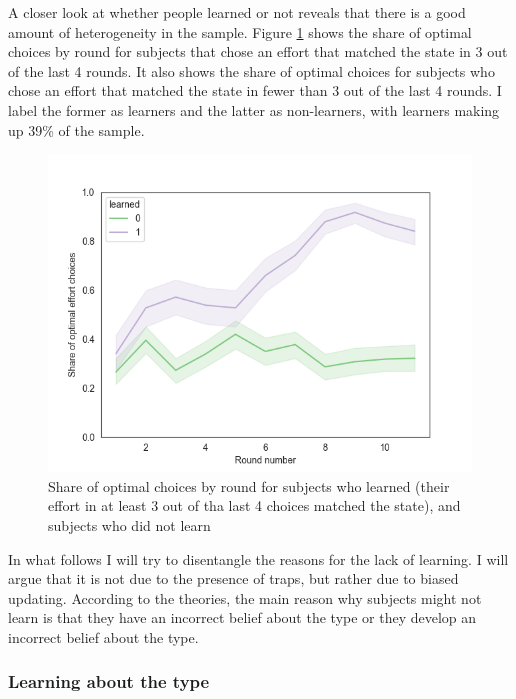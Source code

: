 \documentclass[
  12pt,
]{article}
\begin{document}
A closer look at whether people learned or not reveals that there is a
good amount of heterogeneity in the sample. Figure
\ref{fig:learning-by-groups} shows the share of optimal choices by round
for subjects that chose an effort that matched the state in 3 out of the
last 4 rounds. It also shows the share of optimal choices for subjects
who chose an effort that matched the state in fewer than 3 out of the
last 4 rounds. I label the former as learners and the latter as
non-learners, with learners making up 39\% of the sample.

\begin{figure}
\hypertarget{fig:learning-by-groups}{%
\centering
\includegraphics{../figures/learning_groups.png}
\caption{Share of optimal choices by round for subjects who learned
(their effort in at least 3 out of tha last 4 choices matched the
state), and subjects who did not learn}\label{fig:learning-by-groups}
}
\end{figure}

In what follows I will try to disentangle the reasons for the lack of
learning. I will argue that it is not due to the presence of traps, but
rather due to biased updating. According to the theories, the main
reason why subjects might not learn is that they have an incorrect
belief about the type or they develop an incorrect belief about the
type.

\hypertarget{learning-about-the-type}{%
\subsubsection{Learning about the type}\label{learning-about-the-type}}
\end{document}
